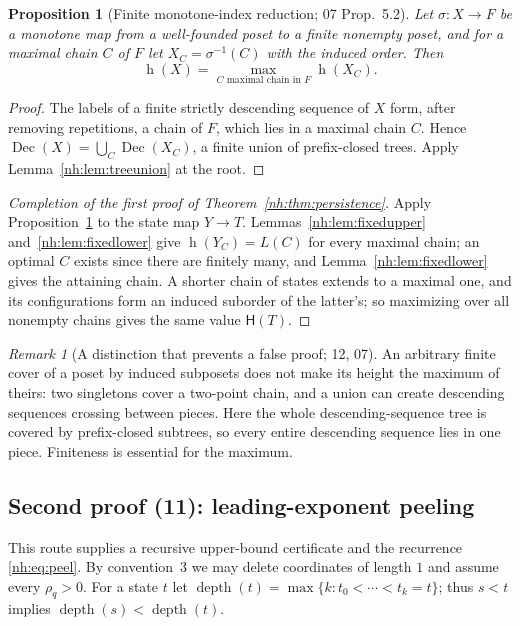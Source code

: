 \documentclass[11pt,a4paper]{article}
\newtheorem{proposition}[theorem]{Proposition}
\theoremstyle{definition}
\theoremstyle{remark}
\newtheorem{remark}[theorem]{Remark}
\newcommand{\hgt}{\operatorname{h}}
\newcommand{\Dec}{\operatorname{Dec}}
\newcommand{\HH}{\mathsf H}
\DeclareMathOperator{\depth}{depth}
\begin{document}
\begin{proposition}[Finite monotone-index reduction; 07 Prop.~5.2]
\label{nh:prop:chaincover}
Let $\sigma:X\to F$ be a monotone map from a well-founded poset to a finite
nonempty poset, and for a maximal chain $C$ of $F$ let $X_C=\sigma^{-1}(C)$ with
the induced order. Then
\[
 \hgt(X)=\max_{C\text{ maximal chain in }F}\hgt(X_C).
\]
\end{proposition}
\begin{proof}
The labels of a finite strictly descending sequence of $X$ form, after
removing repetitions, a chain of $F$, which lies in a maximal chain $C$.
Hence $\Dec(X)=\bigcup_C\Dec(X_C)$, a finite union of prefix-closed trees.
Apply Lemma~\ref{nh:lem:treeunion} at the root.
\end{proof}

\begin{proof}[Completion of the first proof of Theorem~\ref{nh:thm:persistence}]
Apply Proposition~\ref{nh:prop:chaincover} to the state map $Y\to T$.
Lemmas~\ref{nh:lem:fixedupper} and~\ref{nh:lem:fixedlower} give
$\hgt(Y_C)=L(C)$ for every maximal chain; an optimal $C$ exists since there are
finitely many, and Lemma~\ref{nh:lem:fixedlower} gives the attaining chain.
A shorter chain of states extends to a maximal one, and its configurations
form an induced suborder of the latter's; so maximizing over all nonempty
chains gives the same value $\HH(T)$.
\end{proof}

\begin{remark}[A distinction that prevents a false proof; 12, 07]
An arbitrary finite cover of a poset by induced subposets does not make its
height the maximum of theirs: two singletons cover a two-point chain, and a
union can create descending sequences crossing between pieces. Here the
whole descending-sequence tree is covered by prefix-closed subtrees, so every
entire descending sequence lies in one piece. Finiteness is essential for the
maximum.
\end{remark}

\subsection{Second proof (11): leading-exponent peeling}

This route supplies a recursive upper-bound certificate and the recurrence
\eqref{nh:eq:peel}. By convention~3 we may delete coordinates of length $1$
and assume every $\rho_q>0$. For a state $t$ let
$\depth(t)=\max\{k:t_0<\cdots<t_k=t\}$; thus $s<t$ implies
$\depth(s)<\depth(t)$.
\end{document}
